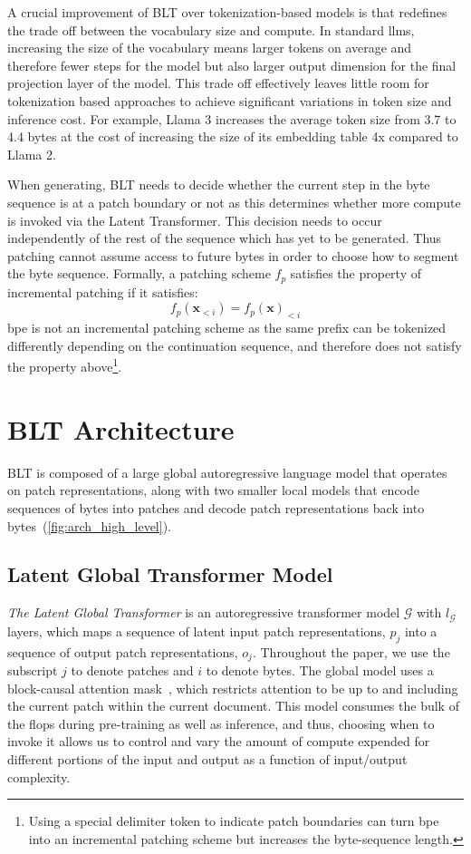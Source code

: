 A crucial improvement of {\textsc BLT} over tokenization-based models is that redefines the trade off between the vocabulary size and compute. In standard llms, increasing the size of the vocabulary means larger tokens on average and therefore fewer steps for the model but also larger output dimension for the final projection layer of the model. This trade off effectively leaves little room for tokenization based approaches to achieve significant variations in token size and inference cost. For example, Llama 3 increases the average token size from  3.7 to 4.4 bytes at the cost of increasing the size of its embedding table 4x compared to Llama 2.

When generating, {\textsc BLT} needs to decide whether the current step in the byte sequence is at a patch boundary or not as this determines whether more compute is invoked via the Latent Transformer. This decision needs to occur independently of the rest of the sequence which has yet to be generated. Thus patching cannot assume access to future bytes in order to choose how to segment the byte sequence. Formally, a patching scheme $f_p$ satisfies the property of incremental patching if it satisfies:
$$f_p(\pmb{x}_{<i}) = f_p(\pmb{x})_{<i}$$
bpe is not an incremental patching scheme as the same prefix can be tokenized differently depending on the continuation sequence, and therefore does not satisfy the property above\footnote{Using a special delimiter token to indicate patch boundaries can turn bpe into an incremental patching scheme but increases the byte-sequence length.}. 

\section{{\textsc BLT} Architecture}
\label{section:architecture}
{\textsc BLT} is composed of a large global autoregressive language model that operates on patch representations, along with two smaller local models that encode sequences of bytes into patches and decode patch representations back into bytes~(\autoref{fig:arch_high_level}). 

\subsection{Latent Global Transformer Model}

\textit{The Latent Global Transformer} is an autoregressive transformer model $\mathcal{G}$ with $l_{\mathcal{G}}$ layers, which maps a sequence of latent input patch representations, $p_j$ into a sequence of output patch representations, $o_j$. Throughout the paper, we use the subscript $j$ to denote patches and $i$ to denote bytes. The global model uses a block-causal attention mask~\citep{dubey2024llama}, which restricts attention to be up to and including the current patch  within the current document. This model consumes the bulk of the flops during pre-training as well as inference, and thus, choosing when to invoke it allows us to control and vary the amount of compute expended for different portions of the input and output as a function of input/output complexity.

